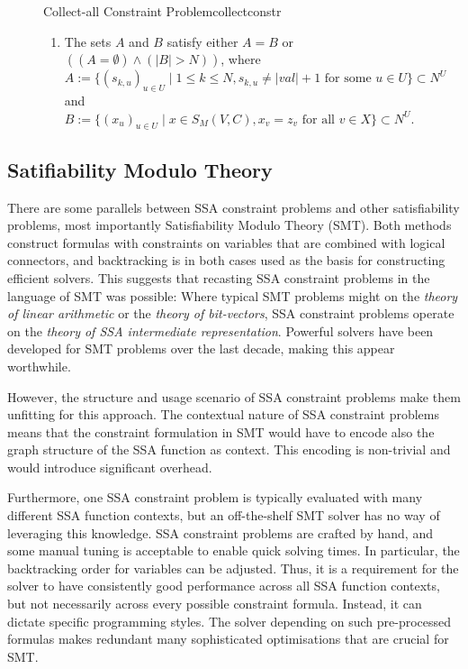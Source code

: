 \begin{figure}[p]
\begin{definition}{Collect-all Constraint Problem}{collectconstr}
\begin{enumerate}
              If there are any duplicates, they have to be of the form $(|val|+1,\dots,|val|+1)\in\mathbb N^U$.
        \item The sets $A$ and $B$ satisfy either $A=B$ or $((A=\emptyset)\mathrel\land(|B|>N))$, where\\
              $A:=\{(s_{k,u})_{u\in U}\mid 1\leq k\leq N, s_{k,u}\neq|val|+1\text{ for some }u\in U\}\subset N^U$ and\\
              $B:=\{(x_u)_{u\in U}\mid x\in S_M(V,C), x_v=z_v\text{ for all }v\in X\}\subset N^U$.
        \end{enumerate}
    \end{definition}
\end{figure}

\subsection{Satifiability Modulo Theory}
\label{sec:SATcomp}

    There are some parallels between SSA constraint problems and other
    satisfiability problems, most importantly Satisfiability Modulo Theory
    (SMT).
    Both methods construct formulas with constraints on variables that are
    combined with logical connectors, and backtracking is in both cases used as
    the basis for constructing efficient solvers.
    This suggests that recasting SSA constraint problems in the language of SMT
    was possible:
    Where typical SMT problems might on the {\em theory of linear arithmetic} or
    the {\em theory of bit-vectors}, SSA constraint problems operate on the
    {\em theory of SSA intermediate representation}.
    Powerful solvers have been developed for SMT problems over the last decade,
    making this appear worthwhile.

    However, the structure and usage scenario of SSA constraint problems make
    them unfitting for this approach.
    The contextual nature of SSA constraint problems means that the constraint
    formulation in SMT would have to encode also the graph structure of the
    SSA function as context.
    This encoding is non-trivial and would introduce significant overhead.

    Furthermore, one SSA constraint problem is typically evaluated with many
    different SSA function contexts, but
    an off-the-shelf SMT solver has no way of leveraging this knowledge.
    SSA constraint problems are crafted by hand, and some manual tuning is
    acceptable to enable quick solving times.
    In particular, the backtracking order for variables can be adjusted.
    Thus, it is a requirement for the solver to have consistently good
    performance across all SSA function contexts, but not necessarily across
    every possible constraint formula.
    Instead, it can dictate specific programming styles.
    The solver depending on such pre-processed formulas makes redundant many
    sophisticated optimisations that are crucial for SMT.

